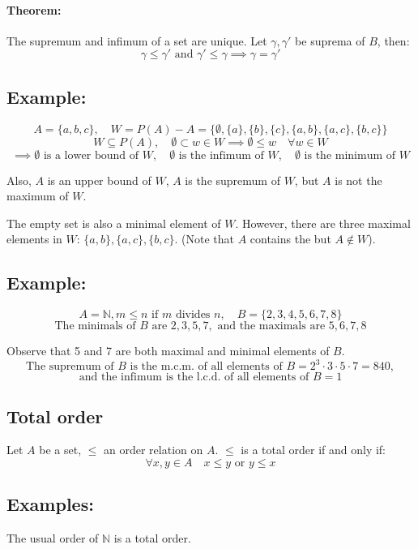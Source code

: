 \documentclass[11pt]{article}
\begin{document}
\paragraph{Theorem: } The supremum and infimum of a set are unique.
Let $\gamma, \gamma'$ be suprema of $B$, then:
\[
\gamma \leq \gamma' \text{ and } \gamma' \leq \gamma \implies \gamma = \gamma'
\]

\subsection*{Example:}
\[
A = \{a,b,c\}, \quad W = P(A) - A = \{\emptyset, \{a\}, \{b\}, \{c\}, \{a,b\}, \{a,c\}, \{b,c\}\}
\]
\[
W \subseteq P(A), \quad \emptyset \subset w \in W \implies \emptyset \leq w \quad \forall w \in W
\]
\[
\implies \emptyset \text{ is a lower bound of } W, \quad \emptyset \text{ is the infimum of } W, \quad \emptyset \text{ is the minimum of } W
\]

Also, $A$ is an upper bound of $W$, $A$ is the supremum of $W$, but $A$ is not the maximum of $W$.

The empty set is also a minimal element of $W$. However, there are three maximal elements in $W$: $\{a,b\}, \{a,c\}, \{b,c\}$. (Note that $A$ contains the but $A \notin W$).

\subsection*{Example:}
\[
A = \mathbb{N}, m \leq n \text{ if } m \text{ divides } n, \quad B = \{2,3,4,5,6,7,8\}
\]
\[
\text{The minimals of $B$ are } 2, 3, 5, 7, \text{ and the maximals are } 5,6,7,8
\]

Observe that 5 and 7 are both maximal and minimal elements of $B$.
\[
\text{The supremum of $B$ is the m.c.m. of all elements of $B$} = 2^3 \cdot 3 \cdot 5 \cdot 7 = 840, 
\]
\[
\text{and the infimum is the l.c.d. of all elements of $B$} = 1
\]

\subsection{Total order}
Let $A$ be a set, $\leq$ an order relation on $A$. $\leq$ is a total order if and only if:
\[
\forall x, y \in A \quad x \leq y \text{ or } y \leq x
\]

\subsection*{Examples:}
The usual order of $\mathbb{N}$ is a total order.
\end{document}
